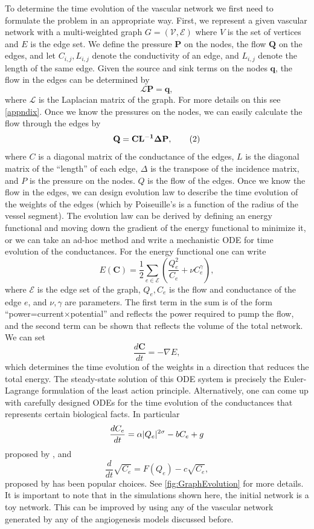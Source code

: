 \documentclass[10pt,a4paper,twocolumn]{article}
\begin{document}
	
	To determine the time evolution of the vascular network we first need to formulate the problem in an appropriate way. First, we represent a given vascular network with a multi-weighted graph $ G=(\mathcal{V},\mathcal{E}) $ where $ V $ is the set of vertices and $ E $ is the edge set. We define the pressure $ \mathbf{P} $ on the nodes, the flow $ \mathbf{Q} $ on the edges, and let $ C_{i,j}, L_{i,j} $ denote the conductivity of an edge, and $ L_{i,j} $ denote the length of the same edge. Given the source and sink terms on the nodes $ \mathbf{q} $, the flow in the edges can be determined by
	\[ \mathcal{L} \mathbf{P} = \mathbf{q}, \]
	where $ \mathcal{L} $ is the Laplacian matrix of the graph. For more details on this see \autoref{appndix}. Once we know the pressures on the nodes, we can easily calculate the flow through the edges by 
	\[ \bf{Q} = \bf{C} L^{-1} \bf{\Delta} \bf{P}, \tag{2} \]
	where $ C $ is a diagonal matrix of the conductance of the edges, $ L $ is the diagonal matrix of the ``length'' of each edge, $ \Delta $ is the transpose of the incidence matrix, and $ P $ is the pressure on the nodes. $ Q $ is the flow of the edges. Once we know the flow in the edges, we can design evolution law to describe the time evolution of the weights of the edges (which by Poiseuille's is a function of the radius of the vessel segment). The evolution law can be derived by defining an energy functional and moving down the gradient of the energy functional to minimize it, or we can take an ad-hoc method and write a mechanistic ODE for time evolution of the conductances. For the energy functional one can write
	\[ E(\mathbf{C}) = \frac{1}{2} \sum_{e\in \mathcal{E}}(\frac{Q_e^2}{C_e} + \nu C_e^\gamma), \]
	where $ \mathcal{E} $ is the edge set of the graph, $ Q_e, C_e $ is the flow and conductance of the edge $ e $, and $ \nu,\gamma $ are parameters. The first term in the sum is of the form ``power=current$ \times $potential'' and reflects the power required to pump the flow, and the second term can be shown that reflects the volume of the total network. We can set
	\[ \frac{d \mathbf{C}}{dt} = -\nabla E, \]
	which determines the time evolution of the weights in a direction that reduces the total energy. The steady-state solution of this ODE system is precisely the Euler-Lagrange formulation of the least action principle. Alternatively, one can come up with carefully designed ODEs for the time evolution of the conductances that represents certain biological facts. In particular
	\[ \frac{d C_e}{dt} = \alpha |Q_e|^{2\sigma} - b C_e + g \]
	proposed by \cite{Ronellenfitsch2016}, and 
	\[ \frac{d}{dt} \sqrt{C_e} = F(Q_e) - c\sqrt{C_e}, \]
	proposed by \cite{Almeida2022} has been popular choices. See \autoref{fig:GraphEvolution} for more details. It is important to note that in the simulations shown here, the initial network is a toy network. This can be improved by using any of the vascular network generated by any of the angiogenesis models discussed before.
	
\end{document}
